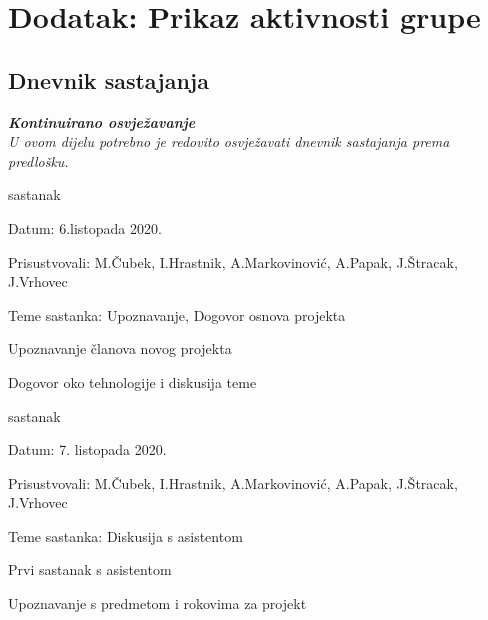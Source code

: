 \chapter*{Dodatak: Prikaz aktivnosti grupe}
		
		\section*{Dnevnik sastajanja}
		
		\textbf{\textit{Kontinuirano osvježavanje}}\\
		
		 \textit{U ovom dijelu potrebno je redovito osvježavati dnevnik sastajanja prema predlošku.}
		
		\begin{packed_enum}
			\item  sastanak
			
			\item[] \begin{packed_item}
				\item Datum: 6.listopada 2020.
				\item Prisustvovali: M.Čubek, I.Hrastnik, A.Markovinović, A.Papak, J.Štracak, J.Vrhovec
				\item Teme sastanka: Upoznavanje, Dogovor osnova projekta
				\begin{packed_item}
					\item  Upoznavanje članova novog projekta
					\item  Dogovor oko tehnologije i diskusija teme
				\end{packed_item}
			\end{packed_item}
			
			\item  sastanak
			\item[] \begin{packed_item}
				\item Datum: 7. listopada 2020.
				\item Prisustvovali: M.Čubek, I.Hrastnik, A.Markovinović, A.Papak, J.Štracak, J.Vrhovec
				\item Teme sastanka: Diskusija s asistentom
				\begin{packed_item}
					\item  Prvi sastanak s asistentom
					\item  Upoznavanje s predmetom i rokovima za projekt
				\end{packed_item}
			\end{packed_item}
		

\end{packed_enum}
